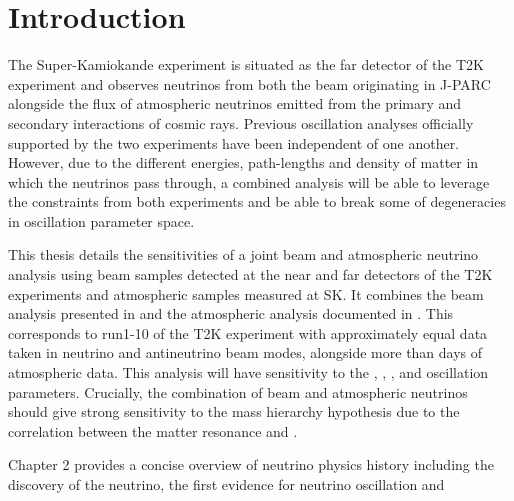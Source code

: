 \chapter{Introduction}
\label{chap:Introduction}

The Super-Kamiokande experiment is situated as the far detector of the T2K experiment and observes neutrinos from both the beam originating in J-PARC alongside the flux of atmospheric neutrinos emitted from the primary and secondary interactions of cosmic rays. Previous oscillation analyses officially supported by the two experiments have been independent of one another. However, due to the different energies, path-lengths and density of matter in which the neutrinos pass through, a combined analysis will be able to leverage the constraints from both experiments and be able to break some of degeneracies in oscillation parameter space.

This thesis details the sensitivities of a joint beam and atmospheric neutrino analysis using beam samples detected at the near and far detectors of the T2K experiments and atmospheric samples measured at SK. It combines the beam analysis presented in \cite{Dunne2020-uf} and the atmospheric analysis documented in \cite{Jiang2019-iw}. This corresponds to run1-10 of the T2K experiment with approximately equal data taken in neutrino and antineutrino beam modes, alongside more than  days of atmospheric data. This analysis will have sensitivity to the , , , and  oscillation parameters. Crucially, the combination of beam and atmospheric neutrinos should give strong sensitivity to the mass hierarchy hypothesis due to the correlation between the matter resonance and .

Chapter 2 provides a concise overview of neutrino physics history including the discovery of the neutrino, the first evidence for neutrino oscillation and 
